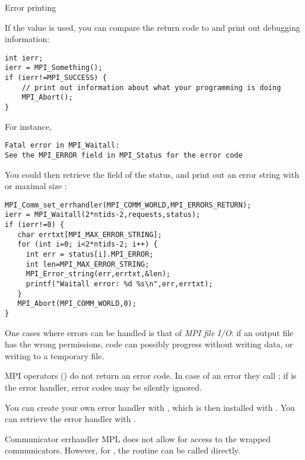  {Error printing}
\label{sec:mpi-error-print}

If the  value  is used,
you can compare the return code to 
and  print out debugging information:

\begin{lstlisting}
int ierr;
ierr = MPI_Something();
if (ierr!=MPI_SUCCESS) {
    // print out information about what your programming is doing
    MPI_Abort();
}
\end{lstlisting}
For instance,
\begin{verbatim}
Fatal error in MPI_Waitall: 
See the MPI_ERROR field in MPI_Status for the error code
\end{verbatim}
You could then retrieve the  field of the
status, and print out an error string with
or maximal size :
\begin{lstlisting}
MPI_Comm_set_errhandler(MPI_COMM_WORLD,MPI_ERRORS_RETURN);
ierr = MPI_Waitall(2*ntids-2,requests,status);
if (ierr!=0) {
   char errtxt[MPI_MAX_ERROR_STRING];
   for (int i=0; i<2*ntids-2; i++) {
     int err = status[i].MPI_ERROR;
     int len=MPI_MAX_ERROR_STRING;
     MPI_Error_string(err,errtxt,&len);
     printf("Waitall error: %d %s\n",err,errtxt);
   }
   MPI_Abort(MPI_COMM_WORLD,0);
}
\end{lstlisting}
One cases where errors can be handled is that of \emph{MPI file
  I/O}: if an output file has the wrong
permissions, code can possibly progress without writing data, or
writing to a temporary file.

MPI operators () do not return an error code. In case of
an error they call ; if 
is the error handler, error codes may be silently ignored.

You can create your own error handler with
, which is then installed with
. You can retrieve the error
handler with .

\begin{mplnote}{Communicator errhandler}
  \ac{MPL} does not allow for access to the wrapped communicators.
  However, for , the routine
  can be called directly.
\end{mplnote}

